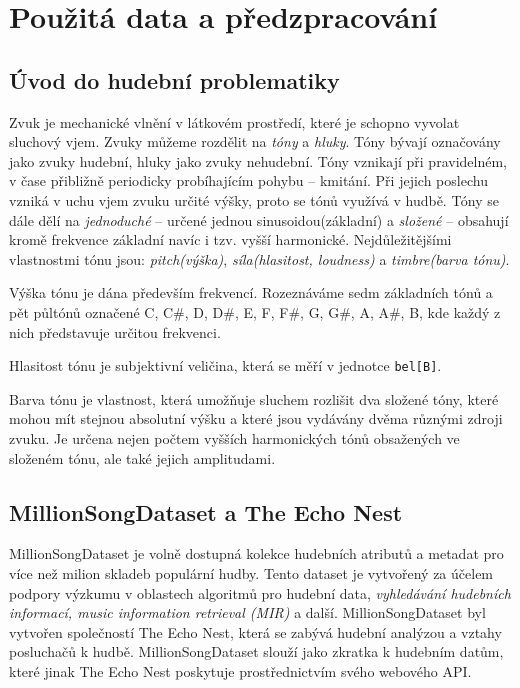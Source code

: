 \documentclass[thesis=M,czech]{FITthesis}[2012/06/26]
\begin{document}
\chapter{Použitá data a předzpracování}\label{ch:empl_prepro}
\section{Úvod do hudební problematiky}
Zvuk je mechanické vlnění v látkovém prostředí, které je schopno vyvolat sluchový vjem. Zvuky můžeme rozdělit na \textit{tóny} a \textit{hluky}. Tóny bývají označovány jako zvuky hudební, hluky jako zvuky nehudební. Tóny vznikají při pravidelném, v čase přibližně periodicky probíhajícím pohybu -- kmitání. Při jejich poslechu vzniká v uchu vjem zvuku určité výšky, proto se tónů využívá v hudbě. Tóny se dále dělí na \textit{jednoduché} -- určené jednou sinusoidou(základní) a \textit{složené} -- obsahují kromě frekvence základní navíc i tzv. vyšší harmonické. Nejdůležitějšími vlastnostmi tónu jsou: \textit{pitch(výška)}, \textit{síla(hlasitost, loudness)} a \textit{timbre(barva tónu)}.

Výška tónu je dána především frekvencí. Rozeznáváme sedm základních tónů a pět půltónů označené C, C\#, D, D\#, E, F, F\#, G, G\#, A, A\#, B, kde každý z nich představuje určitou frekvenci.

Hlasitost tónu je subjektivní veličina, která se měří v jednotce \texttt{bel[B]}.

Barva tónu je vlastnost, která umožňuje sluchem rozlišit dva složené tóny, které mohou mít stejnou absolutní výšku a které jsou vydávány dvěma různými zdroji zvuku. Je určena nejen počtem vyšších harmonických tónů obsažených ve složeném tónu, ale také jejich amplitudami.~\cite{zvuk-ency}
 



\section{MillionSongDataset a The Echo Nest}
MillionSongDataset je volně dostupná kolekce hudebních atributů a metadat pro více než milion skladeb populární hudby. Tento dataset je vytvořený za účelem podpory výzkumu v oblastech algoritmů pro hudební data, \textit{vyhledávání hudebních informací, music information retrieval (MIR)} a další. MillionSongDataset byl vytvořen společností The Echo Nest, která se zabývá hudební analýzou a vztahy posluchačů k hudbě. MillionSongDataset slouží jako zkratka k hudebním datům, které jinak The Echo Nest poskytuje prostřednictvím svého webového API.
\end{document}
